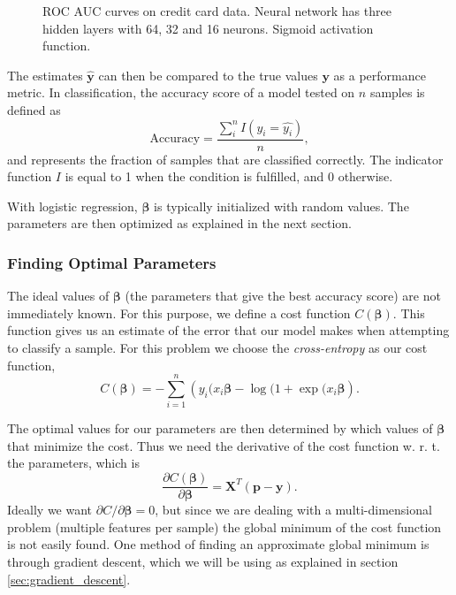 \documentclass[%
 reprint,
nofootinbib,
 amsmath,amssymb,
 aps,
]{revtex4-2}
\begin{document}
\begin{figure}[h!]
\caption{ROC AUC curves on credit card data. Neural network has three hidden layers with 64, 32 and 16 neurons. Sigmoid activation function.}
\label{fig:roc_curves_NN}
\end{figure}

%
The estimates $\boldsymbol{\hat{y}}$ can then be compared to the true values $\boldsymbol{y}$ as a performance metric. In classification, the accuracy score of a model tested on $n$ samples is defined as
%
\begin{equation*}
\textrm{Accuracy} = \frac{\sum_{i}^n I(y_i = \hat{y_i})}{n} ,
\end{equation*}
%
and represents the fraction of samples that are classified correctly. The indicator function $I$ is equal to 1 when the condition is fulfilled, and 0 otherwise.

With logistic regression, $\boldsymbol{\beta}$ is typically initialized with random values. The parameters are then optimized as explained in the next section.

\subsubsection{Finding Optimal Parameters}
The ideal values of $\boldsymbol{\beta}$ (the parameters that give the best accuracy score) are not immediately known. For this purpose, we define a cost function $C(\boldsymbol{\beta})$. This function gives us an estimate of the error that our model makes when attempting to classify a sample. For this problem we choose the \textit{cross-entropy} as our cost function,
%
\begin{equation*}
    C(\boldsymbol{\beta}) = -\sum_{i=1}^n \left( y_i(x_i\boldsymbol{\beta} - \log(1 + \exp(x_i\boldsymbol{\beta}\right) .
\end{equation*}
%

The optimal values for our parameters are then determined by which values of $\boldsymbol{\beta}$ that minimize the cost. Thus we need the derivative of the cost function w. r. t. the parameters, which is
%
\begin{equation*}
    \frac{\partial C(\boldsymbol{\beta})}{\partial \boldsymbol{\beta}} = \boldsymbol{X}^T(\boldsymbol{p} - \boldsymbol{y}) .
\end{equation*}
%
Ideally we want $\partial C / \partial \boldsymbol{\beta} = 0$, but since we are dealing with a multi-dimensional problem (multiple features per sample) the global minimum of the cost function is not easily found. One method of finding an approximate global minimum is through gradient descent, which we will be using as explained in section \ref{sec:gradient_descent}.
\end{document}
